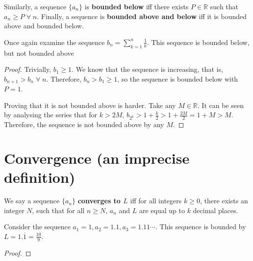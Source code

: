 Similarly, a sequence $\{a_n\}$ is \textbf{bounded below} iff there exists $P \in \mathbb{R}$ such that  $a_n \geq P \;\forall\; n$. Finally, a sequence is \textbf{bounded above and below} iff it is bounded above and bounded below.

\ex
Once again examine the sequence $b_n = \sum_{k = 1}^n \frac{1}{k}$. This sequence is bounded below, but not bounded above

\begin{proof}
  Trivially, $b_1 \geq 1$. We know that the sequence is increasing, that is, $b_{n + 1} > b_n \;\forall\; n$. Therefore, $b_n > b_1 \geq 1$, so the sequence is bounded below with $P = 1$.

  Proving that it is not bounded above is harder. Take any $M \in \mathbb{R}$. It can be seen by analysing the series that for $k > 2M$, $b_{2^k} > 1 + \frac{k}{2} > 1 + \frac{2M}{2} = 1 + M > M$. Therefore, the sequence is not bounded above by any $M$.
\end{proof}

\section{Convergence (an imprecise definition)}
We say a sequence $\{a_n\}$ \textbf{converges to $L$} iff for all integers $k \geq 0$, there exists an integer $N$, such that for all $n \geq N$, $a_n$ and $L$ are equal up to $k$ decimal places.

\ex
Consider the sequence $a_1 = 1, a_2 = 1.1, a_3 = 1.11 \cdots $. This sequence is bounded by $L = 1.\overline{1} = \frac{10}{9}$.

\begin{proof}

\end{proof}


